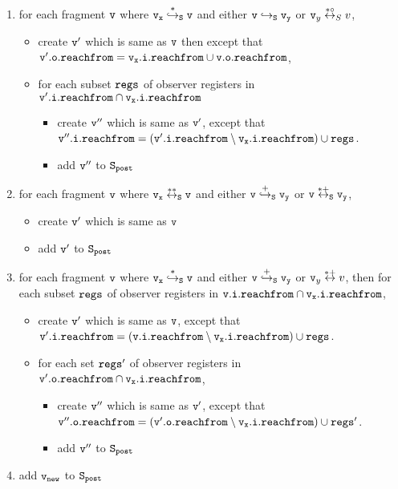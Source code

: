 \begin{description}
\begin{enumerate}
\item for each fragment $\tt v$ where $\tt v_x \overset{*}\hookrightarrow_S v$ and either $\tt v \hookrightarrow_S \mathtt{v}_y$ or $\mathtt{v}_y \overset{*\circ}\leftrightarrow_S v$,  
\begin{itemize}
\item create $\tt v'$ which is same as $\tt v$ then except that $\tt \mathtt{v}'.\mathtt{o}.\mathtt{reachfrom} = v_x.i.reachfrom \cup \tt \mathtt{v}.\mathtt{o}.\mathtt{reachfrom}$, 
\item for each subset $\tt regs$ of observer registers in $\mathtt{v}'.\mathtt{i}.\mathtt{reachfrom} \cap \tt v_x.i.reachfrom$
\begin{itemize}
\item create $\tt v''$ which is same as $\tt v'$, except that $\tt v''.i.reachfrom = (\mathtt{v}'.\mathtt{i}.\mathtt{reachfrom} \setminus v_x.i.reachfrom) \cup regs$.
\item add $\tt v''$ to $\tt S_{post}$
\end{itemize}
\end{itemize}

\item for each fragment $\tt v$ where $\tt v_x \overset{**}\leftrightarrow_S v$ and either $\tt v \overset{+}\hookrightarrow_S \mathtt{v}_y$ or $\tt v \overset{*+}\leftrightarrow_S \mathtt{v}_y$, 
\begin{itemize}
\item create $\tt v'$ which is same as $\tt v$
\item  add $\tt v'$ to $\tt S_{post}$
\end{itemize}

\item for each fragment $\tt v$ where $\tt v_x \overset{*}\hookrightarrow_S v$ and either $\tt v \overset{+}\hookrightarrow_S \mathtt{v}_y$ or $\mathtt{v}_y \overset{*+}\leftrightarrow v$, then for each subset $\tt regs$ of observer registers in $\tt \mathtt{v}.\mathtt{i}.\mathtt{reachfrom} \cap \tt v_x.i.reachfrom$, 
\begin{itemize}
\item create $\tt v'$ which is same as $\tt v$, except that $\mathtt{v}'.\mathtt{i}.\mathtt{reachfrom} = (\tt \mathtt{v}.\mathtt{i}.\mathtt{reachfrom} \setminus v_x.i.reachfrom) \cup regs$. 
 \item for each set $\tt regs'$ of observer registers in $\mathtt{v}'.\mathtt{o}.\mathtt{reachfrom} \cap \tt v_x.i.reachfrom$,  
\begin{itemize}
\item create $\tt v''$ which is same as $\tt v'$, except that $\tt v''.o.reachfrom = (\mathtt{v}'.\mathtt{o}.\mathtt{reachfrom} \setminus v_x.i.reachfrom) \cup regs'$. 
\item add $\tt v''$ to $\tt S_{post}$
\end{itemize}
\end{itemize}
\item add $\tt v_{new}$ to $\tt S_{post}$
\end{enumerate}

\end{description}

